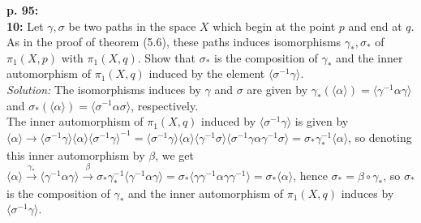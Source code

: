 \documentclass[a4paper]{article}
\begin{document}
    \textbf{p. 95:}\\
    \textbf{10:} Let $\gamma, \sigma$ be two paths in the space $X$ which begin
    at the point $p$ and end at $q$. As in the proof of theorem
    (5.6), these paths induces isomorphisms $\gamma_*, \sigma_*$ of
    $\pi_1 (X, p)$ with $\pi_1(X,q)$. Show that
    $\sigma_*$ is the composition of $\gamma_*$ and the inner automorphism
    of $\pi_1 (X,q)$ induced by the element $\langle \sigma^{-1}\gamma
    \rangle$.\\
    \linebreak
    \textit{Solution:}
    The isomorphisms induces by $\gamma$ and $\sigma$ are given by
    $\gamma_* \left( \langle \alpha \rangle  \right) 
    = \langle \gamma^{-1} \alpha \gamma \rangle $ and
    $\sigma_* \left( \langle \alpha \rangle  \right) 
    = \langle \sigma^{-1} \alpha \sigma \rangle $, respectively.\\
    The inner automorphism of $\pi_1 (X,q)$ induced by
    $\langle \sigma^{-1} \gamma \rangle$ is
    given by
    $\langle \alpha \rangle \to 
    \langle \sigma^{-1} \gamma \rangle \langle \alpha \rangle
    \langle \sigma^{-1} \gamma\rangle^{-1}
    = \langle \sigma^{-1} \gamma \rangle 
    \langle \alpha \rangle \langle \gamma^{-1} \sigma \rangle 
    \langle \sigma^{-1} \gamma \alpha \gamma^{-1} \sigma \rangle 
    = \sigma_* \gamma^{-1}_* \langle \alpha \rangle $, so denoting this
    inner
    automorphism by $\beta$, we get
    $\langle \alpha \rangle \stackrel{\gamma_*}{\to }
    \langle \gamma^{-1}\alpha \gamma \rangle 
    \stackrel{\beta}{\to }
    \sigma_* \gamma^{-1}_* \langle \gamma^{-1} \alpha \gamma \rangle 
    = \sigma_* \langle \gamma \gamma^{-1} \alpha \gamma \gamma^{-1} \rangle 
    = \sigma_* \langle \alpha \rangle $, hence
    $\sigma_* = \beta \circ \gamma_*$, so
    $\sigma_*$ is the composition of
    $\gamma_*$ and the inner automorphism of
    $\pi_1 \left( X, q \right) $ induces by
    $\langle \sigma^{-1} \gamma \rangle $.\\
    \linebreak
    
\end{document}
